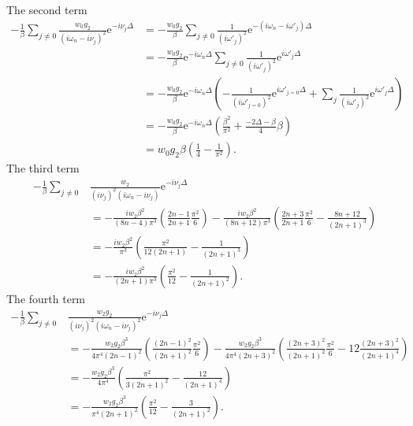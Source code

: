 \documentclass[12pt,a4paper]{scrartcl}
\numberwithin{equation}{section}
\begin{document}
The second term
\begin{align}
   -\frac{1}{\beta}\sum_{j\neq 0} \frac{w_0 g_2}{(i\omega_n-i\nu_j)^2}\mathrm{e}^{-i\nu_j \Delta}
&= -\frac{w_0 g_2}{\beta}\sum_{j\neq 0} \frac{1}{(i\omega'_j)^2}\mathrm{e}^{-(i\omega_n-i\omega'_j) \Delta} \\
&= -\frac{w_0 g_2}{\beta} \mathrm{e}^{-i\omega_n\Delta} \sum_{j\neq 0} \frac{1}{(i\omega'_j)^2}\mathrm{e}^{i\omega'_j \Delta} \\
&= -\frac{w_0 g_2}{\beta} \mathrm{e}^{-i\omega_n\Delta}
     \left(-\frac{1}{(i\omega'_{j=0})^2}\mathrm{e}^{i\omega'_{j=0} \Delta} +  \sum_{j} \frac{1}{(i\omega'_j)^2}\mathrm{e}^{i\omega'_j \Delta} \right) \\
&= -\frac{w_0 g_2}{\beta} \mathrm{e}^{-i\omega_n\Delta}
      \left(\frac{\beta^2}{\pi^2} +  \frac{-2\Delta - \beta}{4}\beta \right) \\
&= w_0 g_2\beta \left( \frac{1}{4} - \frac{1}{\pi^2} \right).
\end{align}
The third term
\begin{align}
-\frac{1}{\beta}\sum_{j\neq 0} & \frac{w_2}{(i\nu_j)^2(i\omega_n-i\nu_j)}\mathrm{e}^{-i\nu_j \Delta} \\
&= -\frac{iw_2\beta^2}{(8n- 4)\pi^3}\left( \frac{2n-1}{2n+1}\frac{\pi^2}{6} \right)
   -\frac{iw_2\beta^2}{(8n+12)\pi^3}\left( \frac{2n+3}{2n+1}\frac{\pi^2}{6} -\frac{8n+12}{(2n+1)^3}\right) \\
&= -\frac{iw_2\beta^2}{\pi^3}\left( \frac{\pi^2}{12(2n+1)} - \frac{1}{(2n+1)^3} \right)   \\
&= -\frac{iw_2\beta^2}{(2n+1)\pi^3}\left( \frac{\pi^2}{12} - \frac{1}{(2n+1)^2} \right) .
\end{align}
The fourth term
\begin{align}
 -\frac{1}{\beta}\sum_{j\neq 0} & \frac{w_2g_2}{(i\nu_j)^2(i\omega_n-i\nu_j)^2} \mathrm{e}^{-i\nu_j \Delta} \\
&= -\frac{w_2g_2\beta^3}{4\pi^4(2n-1)^2}\left( \frac{(2n-1)^2}{(2n+1)^2}\frac{\pi^2}{6} \right)
   -\frac{w_2g_2\beta^3}{4\pi^4(2n+3)^2}\left( \frac{(2n+3)^2}{(2n+1)^2}\frac{\pi^2}{6} -12\frac{(2n+3)^2}{(2n+1)^4}\right) \\
%
&= -\frac{w_2g_2\beta^3}{4\pi^4}\left(  \frac{\pi^2}{3(2n+1)^2}  -\frac{12}{(2n+1)^4} \right) \\
&= -\frac{w_2g_2\beta^3}{\pi^4(2n+1)^2}\left(  \frac{\pi^2}{12}  -\frac{3}{(2n+1)^2} \right) .
\end{align}
\end{document}
